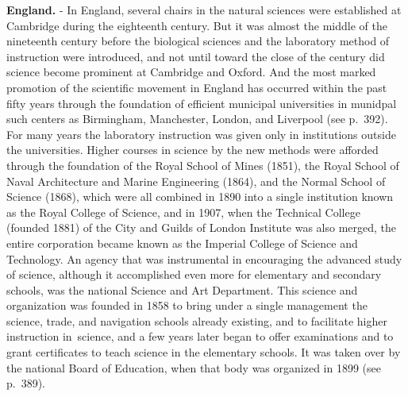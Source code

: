 \documentclass[]{book}
\begin{document}
\textbf{England.} - In England, several chairs in the natural sciences were established at Cambridge during the eighteenth century. But it was almost the middle of the nineteenth century before the biological sciences and the laboratory method of instruction were introduced, and not until toward the close of the century did science become prominent at Cambridge and Oxford. And the most marked promotion of the scientific movement in England has occurred within the past fifty years through the foundation of efficient municipal universities in munidpal such centers as Birmingham, Manchester, London, and Liverpool (see p.~392). For many years the laboratory instruction was given only in institutions outside the universities. Higher courses in science by the new methods were afforded through the foundation of the Royal School of Mines (1851), the Royal School of Naval Architecture and Marine Engineering (1864), and the Normal School of Science (1868), which were all combined in 1890 into a single institution known as the Royal College of Science, and in 1907, when the Technical College (founded 1881) of the City and Guilds of London Institute was also merged, the entire corporation became known as the Imperial College of Science and Technology. An agency that was instrumental in encouraging the advanced study of science, although it accomplished even more for elementary and secondary schools, was the national Science and Art Department. This science and organization was founded in 1858 to bring under a single management the science, trade, and navigation schools already existing, and to facilitate higher instruction in~science, and a few years later began to offer examinations and to grant certificates to teach science in the elementary schools. It was taken over by the national Board of Education, when that body was organized in 1899 (see p.~389).
\end{document}
